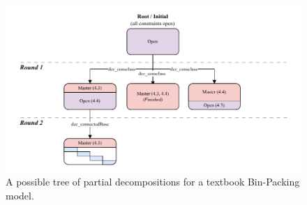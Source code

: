 		\begin{figure}[ht!]
			\centering
			\includegraphics{Bilder/DrawIO/example_tree}
			\caption{A possible tree of partial decompositions for a textbook Bin-Packing model.}
			\label{fig:gcg:example:consclass}
		\end{figure}
		